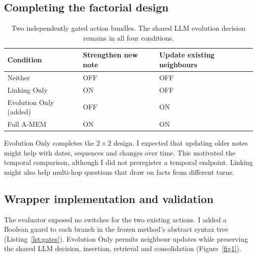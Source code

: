 \documentclass[11pt,a4paper]{article}
\begin{document}
\subsection{Completing the factorial design}
\begin{table}[H]\centering\small\setlength{\tabcolsep}{4pt}
\begin{tabular}{@{}>{\raggedright\arraybackslash}p{}>{\raggedright\arraybackslash}p{}>{\raggedright\arraybackslash}p{}@{}}
\toprule
Condition & Strengthen new note & Update existing neighbours \\
\midrule
Neither & OFF & OFF \\
Linking Only & ON & OFF \\
Evolution Only (added) & OFF & ON \\
Full A-MEM & ON & ON \\
\bottomrule\end{tabular}
\caption{Two independently gated action bundles. The shared LLM evolution decision remains in all four conditions.}\label{tab4}
\end{table}
Evolution Only completes the $2\times2$ design. I expected that updating older notes might help with dates, sequences and changes over time. This motivated the temporal comparison, although I did not preregister a temporal endpoint. Linking might also help multi-hop questions that draw on facts from different turns.

\subsection{Wrapper implementation and validation}
The evaluator exposed no switches for the two existing actions. I added a Boolean guard to each branch in the frozen method’s abstract syntax tree (Listing~\ref{lst:gates}). Evolution Only permits neighbour updates while preserving the shared LLM decision, insertion, retrieval and consolidation (Figure~\ref{fig1}).
\end{document}

